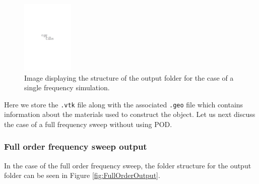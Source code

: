\begin{figure}[H]
\begin{center}
\includegraphics[width=0.22\textwidth]{Figures/vtkoutput}
\caption{Image displaying the structure of the output folder for the case of a single frequency simulation.}\label{fig:VTKOutput}
\end{center}
\end{figure}
\noindent
Here we store the \texttt{.vtk} file along with the associated \texttt{.geo} file which contains information about the materials used to construct the object. Let us next discuss the case of a full frequency sweep without using POD.\\

\subsubsection{Full order frequency sweep output}
In the case of the full order frequency sweep, the folder structure for the output folder can be seen in Figure \ref{fig:FullOrderOutput}.

